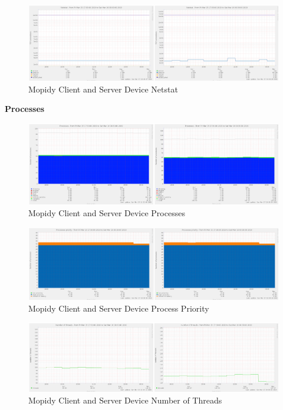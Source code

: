 \documentclass[11pt,a4paper,headinclude=false,footinclude=false]{scrreprt}
\begin{document}
\begin{figure}[H]
\includegraphics{ResultsAndAnalysis/MopidyServerTestImages/018MopidyNetstat.png}
\centering
\caption{Mopidy Client and Server Device Netstat}
\label{MopidyNetstat}
\end{figure}

\textbf{Processes}

\begin{figure}[H]
\includegraphics{ResultsAndAnalysis/MopidyServerTestImages/020MopidyProcesses.png}
\centering
\caption{Mopidy Client and Server Device Processes}
\label{MopidyProcesses}
\end{figure}

\begin{figure}[H]
\includegraphics{ResultsAndAnalysis/MopidyServerTestImages/021MopidyProcessPriority.png}
\centering
\caption{Mopidy Client and Server Device Process Priority}
\label{MopidyProcessPriority}
\end{figure}

\begin{figure}[H]
\includegraphics{ResultsAndAnalysis/MopidyServerTestImages/019MopidyNoOfThreads.png}
\centering
\caption{Mopidy Client and Server Device Number of Threads}
\label{MopidyNumThreads}
\end{figure}
\end{document}
